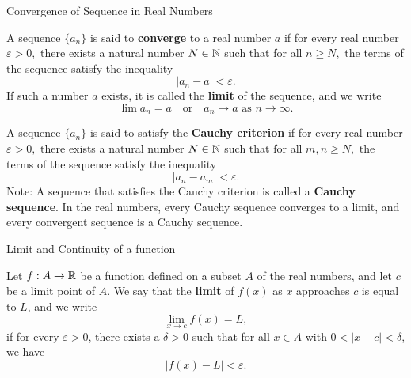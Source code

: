 \documentclass[12pt, a4paper]{article}
\begin{document}
\FrontPage
\Large

\begin{heading}
    Convergence of Sequence in Real Numbers
\end{heading}

\vspace{10pt}


\begin{definition}
	A sequence $\{a_n\}$ is said to \textbf{converge} to a real number $a$ if for every real number $\varepsilon > 0,$ there exists a natural number $N \in \mathbb{N}$ such that for all $n \geq N,$ the terms of the sequence satisfy the inequality 
	\[
	|a_n - a| < \varepsilon.
	\]
	If such a number $a$ exists, it is called the \textbf{limit} of the sequence, and we write
	\[
	\lim a_n = a \quad \text{or} \quad a_n \to a \text{ as } n \to \infty.
	\]
\end{definition}

\clearpage

\begin{definition}
    A sequence $\{a_n\}$ is said to satisfy the \textbf{Cauchy criterion} if for every real number $\varepsilon > 0,$ there exists a natural number $N \in \mathbb{N}$ such that for all $m, n \geq N,$ the terms of the sequence satisfy the inequality 
    \[
    |a_n - a_m| < \varepsilon.
    \]
    Note: A sequence that satisfies the Cauchy criterion is called a \textbf{Cauchy sequence}. In the real numbers, every Cauchy sequence converges to a limit, and every convergent sequence is a Cauchy sequence.
\end{definition}

\clearpage

\begin{heading}
    Limit and Continuity of a function
\end{heading}

\vspace{10pt}

\begin{definition}
    Let $f:A\to\mathbb{R}$ be a function defined on a subset $A$ of the real numbers, and let $c$ be a limit point of $A$. We say that the \textbf{limit} of $f(x)$ as $x$ approaches $c$ is equal to $L$, and we write
\[
\lim_{x \to c} f(x) = L,
\]
if for every $\varepsilon > 0$, there exists a $\delta > 0$ such that for all $x \in A$ with $0 < |x - c| < \delta$, we have
\[
|f(x) - L| < \varepsilon.
\]
\end{definition}
\end{document}
